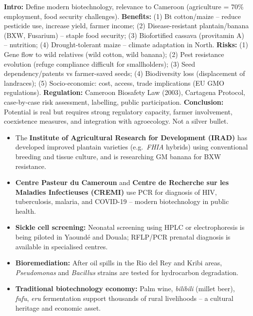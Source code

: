 \documentclass[11pt]{article}
\begin{document}
\begin{corrige}
\textbf{Intro:} Define modern biotechnology, relevance to Cameroon (agriculture = 70\% employment, food security challenges). \textbf{Benefits:} (1) Bt cotton/maize -- reduce pesticide use, increase yield, farmer income; (2) Disease-resistant plantain/banana (BXW, Fusarium) -- staple food security; (3) Biofortified cassava (provitamin A) -- nutrition; (4) Drought-tolerant maize -- climate adaptation in North. \textbf{Risks:} (1) Gene flow to wild relatives (wild cotton, wild banana); (2) Pest resistance evolution (refuge compliance difficult for smallholders); (3) Seed dependency/patents vs farmer-saved seeds; (4) Biodiversity loss (displacement of landraces); (5) Socio-economic: cost, access, trade implications (EU GMO regulations). \textbf{Regulation:} Cameroon Biosafety Law (2003), Cartagena Protocol, case-by-case risk assessment, labelling, public participation. \textbf{Conclusion:} Potential is real but requires strong regulatory capacity, farmer involvement, coexistence measures, and integration with agroecology. Not a silver bullet.
\end{corrige}

\begin{savaistu}
\begin{itemize}
\item The \textbf{Institute of Agricultural Research for Development (IRAD)} has developed improved plantain varieties (e.g.\ \emph{FHIA} hybrids) using conventional breeding and tissue culture, and is researching GM banana for BXW resistance.
\item \textbf{Centre Pasteur du Cameroun} and \textbf{Centre de Recherche sur les Maladies Infectieuses (CREMI)} use PCR for diagnosis of HIV, tuberculosis, malaria, and COVID-19 -- modern biotechnology in public health.
\item \textbf{Sickle cell screening:} Neonatal screening using HPLC or electrophoresis is being piloted in Yaoundé and Douala; RFLP/PCR prenatal diagnosis is available in specialised centres.
\item \textbf{Bioremediation:} After oil spills in the Rio del Rey and Kribi areas, \emph{Pseudomonas} and \emph{Bacillus} strains are tested for hydrocarbon degradation.
\item \textbf{Traditional biotechnology economy:} Palm wine, \emph{bilibili} (millet beer), \emph{fufu}, \emph{eru} fermentation support thousands of rural livelihoods -- a cultural heritage and economic asset.
\end{itemize}
\end{savaistu}
\end{document}
